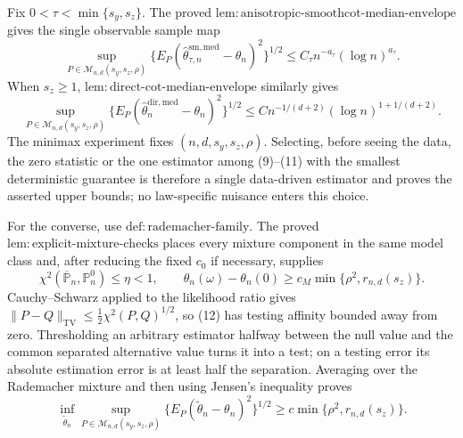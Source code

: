 Fix \(0<\tau<\min\{s_y,s_z\}\). The proved \(\mathrm{lem{:}anisotropic\text{-}smoothcot\text{-}median\text{-}envelope}\) gives the single observable sample map
\[
\sup_{P\in\mathcal M_{n,d}(s_y,s_z,\rho)}
\{E_P(\widehat\theta^{\mathrm{sm,med}}_{\tau,n}-\theta_n)^2\}^{1/2}
\le C_\tau n^{-a_\tau}(\log n)^{a_\tau}.                         \tag{10}
\]
When \(s_z\ge1\), \(\mathrm{lem{:}direct\text{-}cot\text{-}median\text{-}envelope}\) similarly gives
\[
\sup_{P\in\mathcal M_{n,d}(s_y,s_z,\rho)}
\{E_P(\widehat\theta_n^{\mathrm{dir,med}}-\theta_n)^2\}^{1/2}
\le C n^{-1/(d+2)}(\log n)^{1+1/(d+2)}.                            \tag{11}
\]
The minimax experiment fixes \((n,d,s_y,s_z,\rho)\). Selecting, before seeing the data, the zero statistic or the one estimator among (9)--(11) with the smallest deterministic guarantee is therefore a single data-driven estimator and proves the asserted upper bounds; no law-specific nuisance enters this choice.

For the converse, use \(\mathrm{def{:}rademacher\text{-}family}\). The proved \(\mathrm{lem{:}explicit\text{-}mixture\text{-}checks}\) places every mixture component in the same model class and, after reducing the fixed \(c_0\) if necessary, supplies
\[
\chi^2(\overline{\mathbb P}_n,\mathbb P_n^0)\le\eta<1,
\qquad
\theta_n(\omega)-\theta_n(0)\ge c_M\min\{\rho^2,r_{n,d}(s_z)\}.  \tag{12}
\]
Cauchy--Schwarz applied to the likelihood ratio gives \(\|P-Q\|_{\mathrm{TV}}\le\frac12\chi^2(P,Q)^{1/2}\), so (12) has testing affinity bounded away from zero. Thresholding an arbitrary estimator halfway between the null value and the common separated alternative value turns it into a test; on a testing error its absolute estimation error is at least half the separation. Averaging over the Rademacher mixture and then using Jensen's inequality proves
\[
\inf_{\widetilde\theta_n}\sup_{P\in\mathcal M_{n,d}(s_y,s_z,\rho)}
\{E_P(\widetilde\theta_n-\theta_n)^2\}^{1/2}
\ge c\min\{\rho^2,r_{n,d}(s_z)\}.                                 \tag{13}
\]

